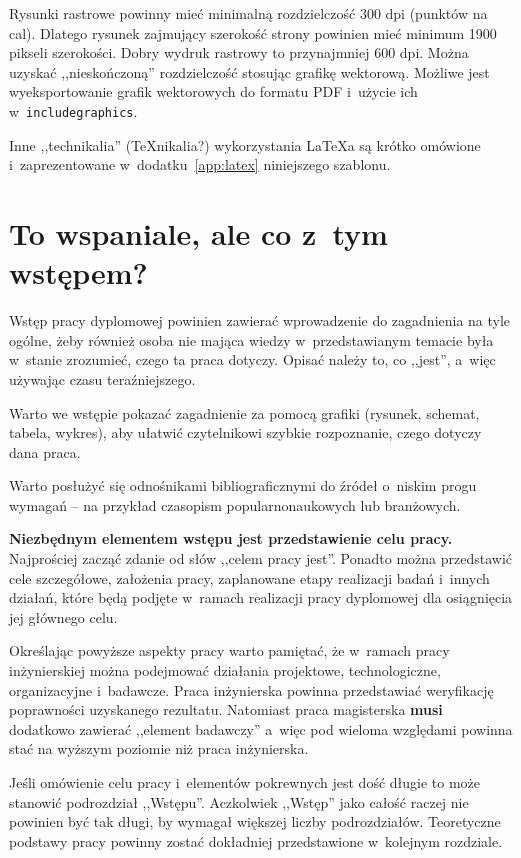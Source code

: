 Rysunki rastrowe powinny mieć minimalną rozdzielczość 300 dpi (punktów na cal). Dlatego rysunek zajmujący szerokość strony powinien mieć minimum 1900 pikseli szerokości. Dobry wydruk rastrowy to przynajmniej 600 dpi. Można uzyskać ,,nieskończoną'' rozdzielczość stosując grafikę wektorową. Możliwe jest wyeksportowanie grafik wektorowych do formatu PDF i~użycie ich w~\texttt{includegraphics}.

Inne ,,technikalia'' (\TeX{nikalia}?) wykorzystania \LaTeX{a} są krótko omówione i~zaprezentowane w~dodatku~\ref{app:latex} niniejszego szablonu.

\section{To wspaniale, ale co z~tym wstępem?}

Wstęp pracy dyplomowej powinien zawierać wprowadzenie do zagadnienia na tyle ogólne, żeby również osoba nie mająca wiedzy w~przedstawianym temacie była w~stanie zrozumieć, czego ta praca dotyczy. Opisać należy to, co ,,jest'', a~więc używając czasu teraźniejszego.

Warto we wstępie pokazać zagadnienie za pomocą grafiki (rysunek, schemat, tabela, wykres), aby ułatwić czytelnikowi szybkie rozpoznanie, czego dotyczy dana praca.

Warto posłużyć się odnośnikami bibliograficznymi do źródeł o~niskim progu wymagań -- na przykład czasopism popularnonaukowych lub branżowych.

\textbf{Niezbędnym elementem wstępu jest przedstawienie celu pracy.} Najprościej zacząć zdanie od słów ,,celem pracy jest''. Ponadto można przedstawić cele szczegółowe, założenia pracy, zaplanowane etapy realizacji badań i~innych działań, które będą podjęte w~ramach realizacji pracy dyplomowej dla osiągnięcia jej głównego celu.

Określając powyższe aspekty pracy warto pamiętać, że w~ramach pracy inżynierskiej można podejmować działania
projektowe, technologiczne, organizacyjne i~badawcze. Praca inżynierska powinna przedstawiać weryfikację poprawności uzyskanego rezultatu. Natomiast praca magisterska \textbf{musi} dodatkowo zawierać ,,element badawczy'' a~więc pod wieloma względami powinna stać na wyższym poziomie niż praca inżynierska.

Jeśli omówienie celu pracy i~elementów pokrewnych jest dość długie to może stanowić podrozdział ,,Wstępu''. Aczkolwiek ,,Wstęp'' jako całość raczej nie powinien być tak długi, by wymagał większej liczby podrozdziałów. Teoretyczne podstawy pracy powinny zostać dokładniej przedstawione w~kolejnym rozdziale.
